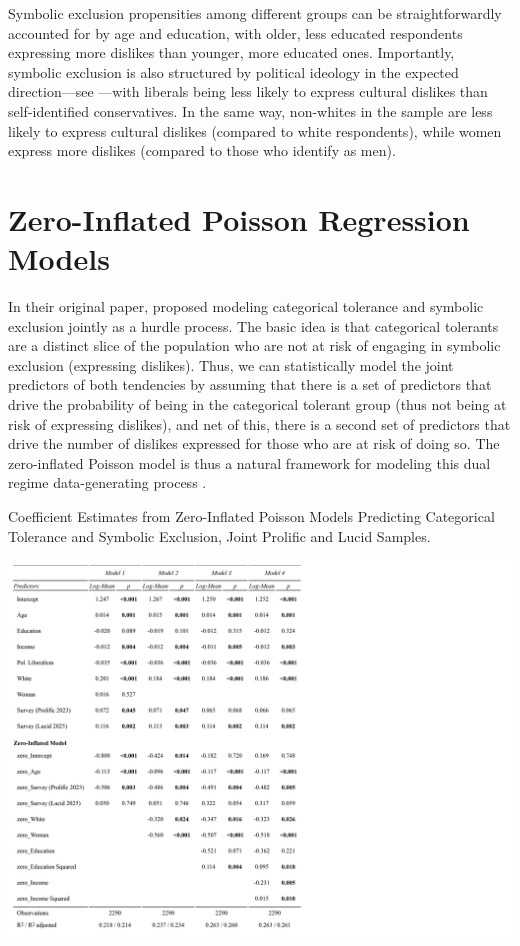 \documentclass[12pt]{article}
\begin{document}
Symbolic exclusion propensities among different groups can be straightforwardly accounted for by age and education, with older, less educated respondents expressing more dislikes than younger, more educated ones. Importantly, symbolic exclusion is also structured by political ideology in the expected direction---see \citet{rawlings2023polarization-0af}---with liberals being less likely to express cultural dislikes than self-identified conservatives. In the same way, non-whites in the sample are less likely to express cultural dislikes (compared to white respondents), while women express more dislikes (compared to those who identify as men). 

\section*{Zero-Inflated Poisson Regression Models}
In their original paper, \citet{lizardo2016end-4fb} proposed modeling categorical tolerance and symbolic exclusion jointly as a hurdle process. The basic idea is that categorical tolerants are a distinct slice of the population who are not at risk of engaging in symbolic exclusion (expressing dislikes). Thus, we can statistically model the joint predictors of both tendencies by assuming that there is a set of predictors that drive the probability of being in the categorical tolerant group (thus not being at risk of expressing dislikes), and net of this, there is a second set of predictors that drive the number of dislikes expressed for those who are at risk of doing so. The zero-inflated Poisson model is thus a natural framework for modeling this dual regime data-generating process \citep{zorn1998analytic-6b1}. 

\begin{table}
    \caption{Coefficient Estimates from Zero-Inflated Poisson Models Predicting Categorical Tolerance and Symbolic Exclusion, Joint Prolific and Lucid Samples.}
    \centering
    \includegraphics[trim={0 15cm 45cm 0},clip, width=1.0\textwidth]{Tabs/zinf-reg.png}
    \label{tab:zinf}
\end{table}
\end{document}
